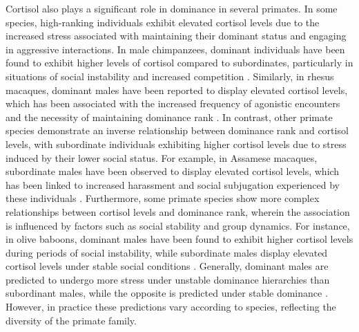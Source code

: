 Cortisol also plays a significant role in dominance in several primates. In some species, high-ranking individuals exhibit elevated cortisol levels due to the increased stress associated with maintaining their dominant status and engaging in aggressive interactions. In male chimpanzees, dominant individuals have been found to exhibit higher levels of cortisol compared to subordinates, particularly in situations of social instability and increased competition \citep{Muller.2004}. Similarly, in rhesus macaques, dominant males have been reported to display elevated cortisol levels, which has been associated with the increased frequency of agonistic encounters and the necessity of maintaining dominance rank \citep{Sapolsky.1992}. In contrast, other primate species demonstrate an inverse relationship between dominance rank and cortisol levels, with subordinate individuals exhibiting higher cortisol levels due to stress induced by their lower social status. For example, in Assamese macaques, subordinate males have been observed to display elevated cortisol levels, which has been linked to increased harassment and social subjugation experienced by these individuals \citep{Ostner.2008}. Furthermore, some primate species show more complex relationships between cortisol levels and dominance rank, wherein the association is influenced by factors such as social stability and group dynamics. For instance, in olive baboons, dominant males have been found to exhibit higher cortisol levels during periods of social instability, while subordinate males display elevated cortisol levels under stable social conditions \citep{Gesquiere.2011}. Generally, dominant males are predicted to undergo more stress under unstable dominance hierarchies than subordinant males, while the opposite is predicted under stable dominance \citep{Kappeler.2004}. However, in practice these predictions vary according to species, reflecting the diversity of the primate family. 

